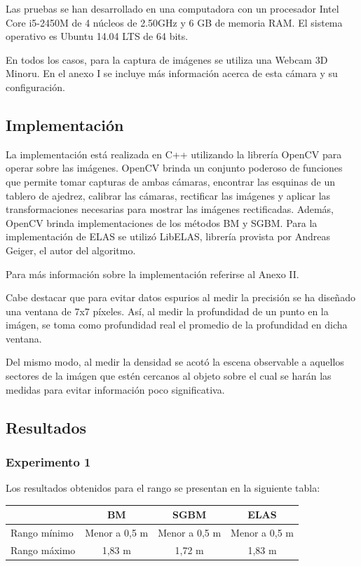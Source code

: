 \documentclass[11pt,a4paper,titlepage]{article}
\begin{document}
Las pruebas se han desarrollado en una computadora con un procesador Intel Core i5-2450M de 4 núcleos de 2.50GHz y 6 GB de memoria RAM. El sistema operativo es Ubuntu 14.04 LTS de 64 bits.

En todos los casos, para la captura de imágenes se utiliza una Webcam 3D Minoru. En el anexo I se incluye más información acerca de esta cámara y su configuración.

\subsection{Implementación}

La implementación está realizada en C++ utilizando la librería OpenCV para operar sobre las imágenes. OpenCV brinda un conjunto poderoso de funciones que permite tomar capturas de ambas cámaras, encontrar las esquinas de un tablero de ajedrez, calibrar las cámaras, rectificar las imágenes y aplicar las transformaciones necesarias para mostrar las imágenes rectificadas. Además, OpenCV brinda implementaciones de los métodos BM y SGBM. Para la implementación de ELAS se utilizó LibELAS, librería provista por Andreas Geiger, el autor del algoritmo.

Para más información sobre la implementación referirse al Anexo II.

Cabe destacar que para evitar datos espurios al medir la precisión se ha diseñado una ventana de 7x7 píxeles. Así, al medir la profundidad de un punto en la imágen, se toma como profundidad real el promedio de la profundidad en dicha ventana.

Del mismo modo, al medir la densidad se acotó la escena observable a aquellos sectores de la imágen que estén cercanos al objeto sobre el cual se harán las medidas para evitar información poco significativa.

\subsection{Resultados}

\subsubsection{Experimento 1}

Los resultados obtenidos para el rango se presentan en la siguiente tabla:

\begin{tabular}{ | l | c | c | c | }
	\hline
	& BM & SGBM & ELAS \\
	\hline
	Rango mínimo & Menor a 0,5 m & Menor a 0,5 m & Menor a 0,5 m \\
	\hline
	Rango máximo & 1,83 m & 1,72 m & 1,83 m \\
	\hline
\end{tabular}
\end{document}
